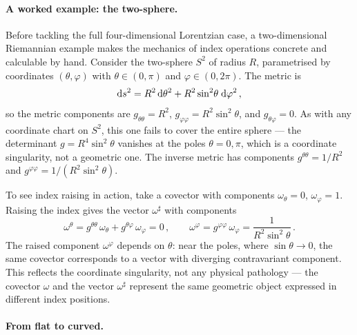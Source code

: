 
\paragraph{A worked example: the two-sphere.}

Before tackling the full four-dimensional Lorentzian case, a two-dimensional
Riemannian example makes the mechanics of index operations concrete and
calculable by hand.  Consider the two-sphere $S^2$ of radius $R$, parametrised
by coordinates $(\theta, \varphi)$ with $\theta \in (0, \pi)$ and
$\varphi \in (0, 2\pi)$.  The metric is
%
\begin{equation}
  \mathrm{d} s^2 = R^2\,\mathrm{d}\theta^2 + R^2\sin^2\!\theta\;\mathrm{d}\varphi^2 \,,
  \label{eq:sphere-metric}
\end{equation}
%
so the metric components are $g_{\theta\theta} = R^2$,
$g_{\varphi\varphi} = R^2\sin^2\!\theta$, and $g_{\theta\varphi} = 0$.  As
with any coordinate chart on $S^2$, this one fails to cover the entire sphere
--- the determinant $g = R^4\sin^2\!\theta$ vanishes at the poles
$\theta = 0, \pi$, which is a coordinate singularity, not a geometric one.
The inverse metric has components $g^{\theta\theta} = 1/R^2$ and
$g^{\varphi\varphi} = 1/(R^2\sin^2\!\theta)$.

To see index raising in action, take a covector with components
$\omega_\theta = 0$, $\omega_\varphi = 1$.  Raising the index gives the
vector $\omega^\sharp$ with components
%
\begin{equation}
  \omega^\theta = g^{\theta\theta}\,\omega_\theta +
    g^{\theta\varphi}\,\omega_\varphi = 0 \,,\qquad
  \omega^\varphi = g^{\varphi\varphi}\,\omega_\varphi =
    \frac{1}{R^2\sin^2\!\theta} \,.
  \label{eq:sphere-raise-example}
\end{equation}
%
The raised component $\omega^\varphi$ depends on $\theta$: near the poles,
where $\sin\theta \to 0$, the same covector corresponds to a vector with
diverging contravariant component.  This reflects the coordinate singularity,
not any physical pathology --- the covector $\omega$ and the vector
$\omega^\sharp$ represent the same geometric object expressed in different
index positions.

\paragraph{From flat to curved.}

